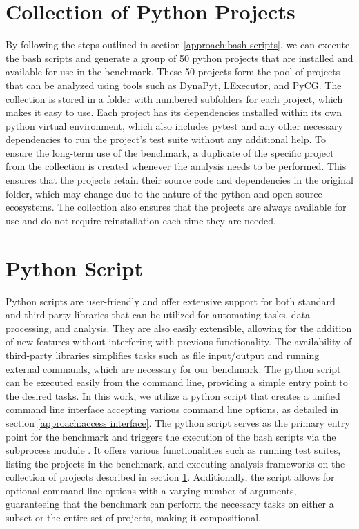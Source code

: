 \section{Collection of Python Projects}
\label{approach:collection of projects}
By following the steps outlined in section \ref{approach:bash scripts}, we can execute the bash scripts and generate a group of 50 python projects that are installed and available for use in the benchmark. These 50 projects form the pool of projects that can be analyzed using tools such as DynaPyt, LExecutor, and PyCG. The collection is stored in a folder with numbered subfolders for each project, which makes it easy to use. Each project has its dependencies installed within its own python virtual environment, which also includes pytest and any other necessary dependencies to run the project's test suite without any additional help. To ensure the long-term use of the benchmark, a duplicate of the specific project from the collection is created whenever the analysis needs to be performed. This ensures that the projects retain their source code and dependencies in the original folder, which may change due to the nature of the python and open-source ecosystems. The collection also ensures that the projects are always available for use and do not require reinstallation each time they are needed.

\section{Python Script}
\label{approach:python script}
Python scripts are user-friendly and offer extensive support for both standard and third-party libraries that can be utilized for automating tasks, data processing, and analysis. They are also easily extensible, allowing for the addition of new features without interfering with previous functionality. The availability of third-party libraries simplifies tasks such as file input/output and running external commands, which are necessary for our benchmark. The python script can be executed easily from the command line, providing a simple entry point to the desired tasks. In this work, we utilize a python script that creates a unified command line interface accepting various command line options, as detailed in section \ref{approach:access interface}. The python script serves as the primary entry point for the benchmark and triggers the execution of the bash scripts via the subprocess module \cite{python_subprocess}. It offers various functionalities such as running test suites, listing the projects in the benchmark, and executing analysis frameworks on the collection of projects described in section \ref{approach:collection of projects}. Additionally, the script allows for optional command line options with a varying number of arguments, guaranteeing that the benchmark can perform the necessary tasks on either a subset or the entire set of projects, making it compositional.%

